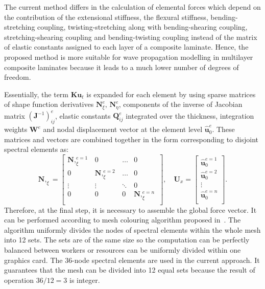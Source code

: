 \documentclass[runningheads]{llncs}
\renewcommand{\vec}[1]{\mathbf{#1}}
\newcommand{\bm}[1]{\mathbf{#1}}
\begin{document}
The current method differs in the calculation of elemental forces which depend on the contribution of the extensional stiffness, the flexural stiffness, bending-stretching coupling,  twisting-stretching along with bending-shearing coupling, stre\-tching-shearing coupling and bending-twisting coupling instead of the matrix of elastic constants assigned to each layer of a composite laminate. 
Hence, the proposed method is more suitable for wave propagation modelling in multilayer composite laminates because it leads to a much lower number of degrees of freedom. 

Essentially, the term \(\bm{K}\vec{u}_t\) is expanded for each element by using sparse matrices of shape function derivatives \(\bm{N}_{\xi}^e,\,\bm{N}_{\eta}^e\), components of the inverse of Jacobian matrix \((\vec{J}^{-1})_{ij}^e\), elastic constants \(\vec{Q}_{ij}^e\) integrated over the thickness, integration weights \(\vec{W}^e\) and nodal displacement vector at the element level \(\hat{\vec{u}}_0^{e} \). 
These matrices and vectors are combined together in the form corresponding to disjoint spectral elements as:
\begin{equation}
\bm{N},_{\xi} = \left[
\begin{array}{cccc}  
\bm{N},_{\xi}^{e=1} & 0 & \ldots & 0\\[2pt]
0& \bm{N},_{\xi}^{e=2}  & \ldots& 0\\[2pt]
\vdots&\vdots&\ddots&0\\[2pt]
0& 0 &0&\bm{N},_{\xi}^{e=n}\\[2pt]
\end{array}\right],\quad
\vec{U}_x = \left[
\begin{array}{c}  
\hat{\vec{u}}_0^{e=1}  \\[2pt]
\hat{\vec{u}}_0^{e=2} \\[2pt]
\vdots\\[2pt]
\hat{\vec{u}}_0^{e=n}\\[2pt]
\end{array}\right].
\end{equation}
Therefore, at the final step, it is necessary to assemble the global force vector. 
It can be performed according to mesh colouring algorithm proposed in~\cite{Kudela2016}. 
The algorithm uniformly divides the nodes of spectral elements within the whole mesh into 12 sets. 
The sets are of the same size so the computation can be perfectly balanced between workers or resources can be uniformly divided within one graphics card.
The 36-node spectral elements are used in the current approach. It guarantees that the mesh can be divided into 12 equal sets because the result of operation \(36/12=3\) is integer.
\end{document}
